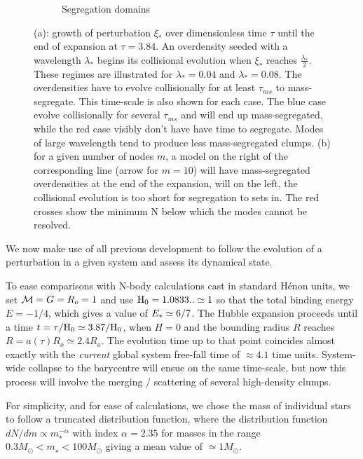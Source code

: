 \begin{figure}
\begin{subfigure}[b]{0.49\textwidth}
        \caption{Segregation domains}
        \label{Fig:1_segregation_zone}
    \end{subfigure}
\caption{(a): growth of perturbation $\xi_*$ over dimensionless time $\tau$ until the end of expansion at $\tau = 3.84$. An overdensity seeded with a wavelength $\lambda_*$ begins its collisional evolution when $\xi_*$ reaches $\frac{\lambda_*}{2}$. These regimes are illustrated for $\lambda_* =0.04$ and  $\lambda_* =0.08$. The overdensities have to evolve collisionally for at least $\tau_{ms}$ to mass-segregate. This time-scale is also shown for each case. The blue case evolve collisionally for several $\tau_{ms}$ and will end up mass-segregated, while the red case visibly don't have have time to segregate. Modes of large wavelength tend to produce less mass-segregated clumps. (b) for a given number of nodes $m$, a model on the right of the corresponding line (arrow for $m=10$) will have mass-segregated overdensities at the end of the expansion, will on the left, the collisional evolution is too short for segregation to sets in. The red crosses show the minimum N below which the modes cannot be resolved.} 
\label{Fig:0_perturbation_growth}
\end{figure}


We now make use of all previous development to follow the evolution of a perturbation in a given system and assess its dynamical state.

To ease comparisons with N-body calculations cast in standard H\'enon units, we set ${\cal M} = G = R_o = 1 $ and use ${\textrm{H}}_0 = 1.0833 .. \simeq 1$ so that the total binding energy $E = -1/4$, which gives a value of $E_\ast \simeq 6/7$. The Hubble expansion proceeds until a time $t = \tau / {\textrm{H}}_0 \simeq 3.87 / {\textrm{H}}_0$, when $H = 0$ and the bounding radius $R$ reaches $R = a(\tau)R_o \simeq 2.4 R_o$. The evolution time up to that point coincides almost exactly with the {\it current} global system free-fall time of $\approx 4.1$ time units. System-wide collapse to the barycentre will ensue on the same time-scale, but now this process will involve the merging / scattering of several high-density clumps. 

For simplicity, and for ease of calculations, we chose the mass of individual stars to follow a  truncated \cite{Salpeter1955} distribution function, where the distribution function $ dN/dm \propto m_\star^{-\alpha}$ with index $\alpha = 2.35$ for masses in the range  $0.3 M_\odot < m_\star < 100 M_\odot$ giving a mean value of $\simeq 1 M_\odot$.


